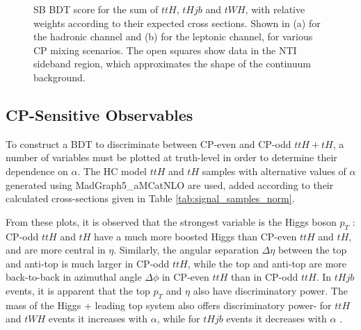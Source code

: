 \begin{figure}[htbp]
  \centering
  \caption{SB BDT score for the sum of $ttH$, $tHjb$ and $tWH$, with relative weights according to their expected cross sections. Shown in (a) for the hadronic channel and (b) for the leptonic channel, for various CP mixing scenarios. The open squares show data in the NTI sideband region, which approximates the shape of the continuum background.  }
  \label{fig:moriondtotal}
\end{figure}


\subsection{CP-Sensitive Observables}

To construct a BDT to discriminate between CP-even and CP-odd $ttH+tH$, a number of variables must be plotted at truth-level in order to determine their dependence on $\alpha$. The HC model $ttH$ and $tH$ samples with alternative values of $\alpha$ generated using MadGraph5\_aMCatNLO are used, added according to their calculated cross-sections given in Table \ref{tab:signal_samples_norm}.

From these plots, it is observed that the strongest variable is the Higgs boson $p_{T}$ : CP-odd $ttH$ and $tH$ have a much more boosted Higgs than CP-even $ttH$ and $tH$, and are more central in $\eta$. Similarly, the angular separation $\Delta \eta$ between the top and anti-top is much larger in CP-odd $ttH$, while the top and anti-top are more back-to-back in azimuthal angle $\Delta \phi$ in CP-even $ttH$ than in CP-odd $ttH$. In $tHjb$ events, it is apparent that the top $p_{T}$ and $\eta$ also have discriminatory power. The mass of the Higgs + leading top system also offers discriminatory power- for $ttH$ and $tWH$ events it increases with $\alpha$, while for $tHjb$ events it decreases with $\alpha$ .

